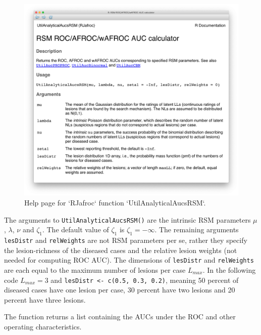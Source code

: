 \documentclass[
]{book}
\begin{document}
\begin{figure}

{\centering \includegraphics{images/rsm-pred/util-analytical-aucs-rsm} 

}

\caption{Help page for `RJafroc` function `UtilAnalyticalAucsRSM`.}\label{fig:rsm-pred-help}
\end{figure}

The arguments to \texttt{UtilAnalyticalAucsRSM()} are the intrinsic RSM parameters \(\mu\), \(\lambda\), \(\nu\) and \(\zeta_1\). The default value of \(\zeta_1\) is \(\zeta_1 = -\infty\). The remaining arguments \texttt{lesDistr} and \texttt{relWeights} are not RSM parameters per se, rather they specify the lesion-richness of the diseased cases and the relative lesion weights (not needed for computing ROC AUC). The dimensions of \texttt{lesDistr} and \texttt{relWeights} are each equal to the maximum number of lesions per case \(L_{max}\). In the following code \(L_{max} = 3\) and \texttt{lesDistr\ \textless{}-\ c(0.5,\ 0.3,\ 0.2)}, meaning 50 percent of diseased cases have one lesion per case, 30 percent have two lesions and 20 percent have three lesions.

The function returns a list containing the AUCs under the ROC and other operating characteristics.
\end{document}
